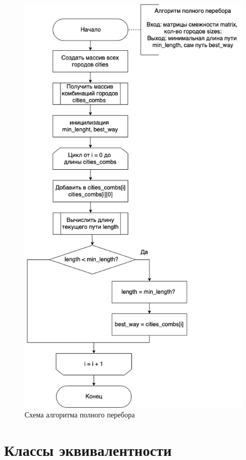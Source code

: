 \clearpage

\begin{figure}[h]
	\centering
	\includegraphics[scale=0.6]{img/full_comb_alg_scheme.png}
	\caption{Схема алгоритма полного перебора}
	\label{fig:full_comb_alg_scheme}
\end{figure}

\clearpage

\section{Классы эквивалентности}


